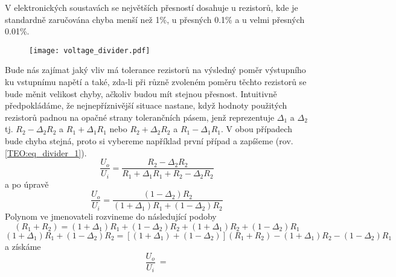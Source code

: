 \begin{example}\label{TEO:ex_CitDiveder01}
  V elektronických soustavách se největších přesností dosahuje u rezistorů, kde je standardně 
  zaručována chyba menší než 1\%, u přesných 0.1\% a u velmi přesných 0.01\%.

  \begin{figure}
   \centering
    \texttt{[image: voltage\_divider.pdf]}
    \caption{ }
    \label{TEO:fig_voltage_divider}
  \end{figure}

  Bude nás zajímat jaký vliv má tolerance rezistorů na výsledný poměr výstupního ku vstupnímu 
  napětí a také, zda-li při různě zvoleném poměru těchto rezistorů se bude měnit velikost chyby, 
  ačkoliv budou mít stejnou přesnost. Intuitivně předpokládáme, že  nejnepříznivější situace  
  nastane, když hodnoty použitých rezistorů padnou na opačné strany tolerančních pásem, jenž 
  reprezentuje $\Delta_1$ a $\Delta_2$ tj. $R_2 - \Delta_2R_2$ a $R_1 + \Delta_1R_1$ nebo $R_2 + 
  \Delta_2R_2$ a $R_1 - \Delta_1R_1$. V obou případech bude chyba stejná, proto si vybereme 
  například první případ a zapíšeme (rov. \ref{TEO:eq_divider_1}).
  \begin{equation}\label{TEO:eq_divider_1}
    \frac{U_o}{U_i} = \frac{R_2-\Delta_2 R_2}{R_1+\Delta_1 R_1+R_2-\Delta_2 R_2}
  \end{equation}
  a po úpravě
  \begin{equation*}
     \frac{U_o}{U_i} = \frac{(1-\Delta_2) R_2}{(1+\Delta_1) R_1+(1-\Delta_2) R_2}
  \end{equation*}
  Polynom ve jmenovateli rozvineme do následující podoby
  \begin{equation*}
     [(1+\Delta_1)+(1-\Delta_2)](R_1+R_2) = 
       (1+\Delta_1)R_1 + (1-\Delta_2)R_2 + (1+\Delta_1)R_2 + (1-\Delta_2)R_1
  \end{equation*}
  \begin{equation*}
    (1+\Delta_1)R_1 + (1-\Delta_2)R_2 = 
      [(1+\Delta_1)+(1-\Delta_2)](R_1+R_2) - (1+\Delta_1)R_2 - (1-\Delta_2)R_1 \nonumber
  \end{equation*}
  a získáme %
  \begin{equation*}
      \frac{U_o}{U_i}\ =

\end{equation*}
\end{example}
